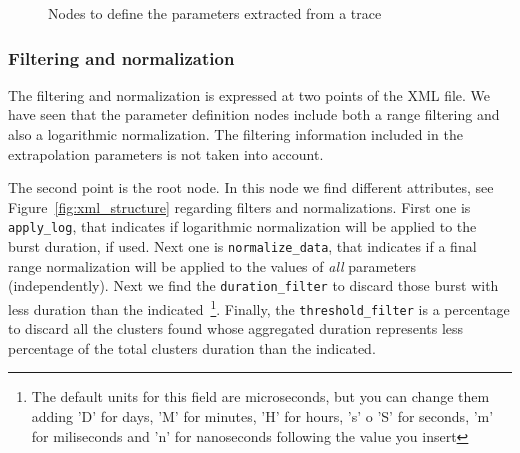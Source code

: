 \documentclass[twoside,a4,english,11pt]{book}
\begin{document}
\begin{figure}
  \centering
  
  
  
  \caption{Nodes to define the parameters extracted from a trace}
  \label{fig:xml_events_definition}

\end{figure}

\subsubsection{Filtering and normalization}

The filtering and normalization is expressed at two points of the XML file.
We have seen that the parameter definition nodes include both a range 
filtering and also a logarithmic normalization. The filtering information
included in the extrapolation parameters is not taken into account.

The second point is the root node. In this node we find different attributes,
see Figure~\ref{fig:xml_structure} regarding filters and normalizations.
First one is \texttt{apply\_log}, that indicates if logarithmic normalization
will be applied to the burst duration, if used. Next one is \texttt{normalize\_data},
that indicates if a final range normalization will be applied to the values 
of \textit{all} parameters (independently). Next we find the
\texttt{duration\_filter} to discard those burst with less duration than the 
indicated~\footnote{The default units for this field are microseconds, but you can
change them adding 'D' for days, 'M' for minutes, 'H' for hours, 's' o 'S' for
seconds, 'm' for miliseconds and 'n' for nanoseconds following the value
you insert}. Finally, the \texttt{threshold\_filter} is a percentage to discard
all the clusters found whose aggregated duration represents less percentage of
the total clusters duration than the indicated.
\end{document}
